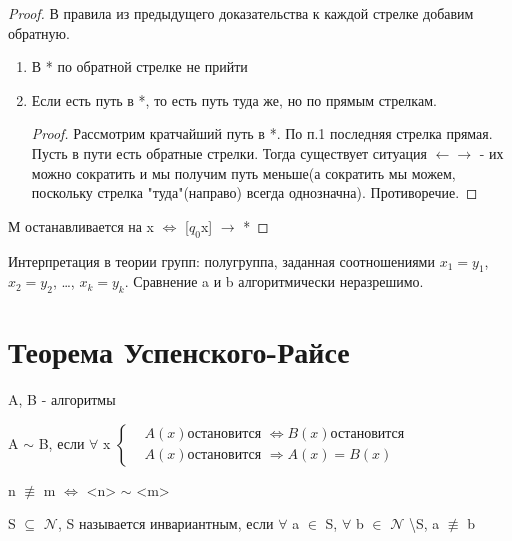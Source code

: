 \begin{proof}
	В правила из предыдущего доказательства к каждой стрелке добавим обратную.
	\begin{enumerate}
		\item В * по обратной стрелке не прийти
		\item Если есть путь в *, то есть путь туда же, но по прямым стрелкам.
		\begin{proof}
			Рассмотрим кратчайший путь в *. По п.1 последняя стрелка прямая. Пусть в пути есть обратные стрелки. Тогда существует ситуация
			$\leftarrow \rightarrow$ - их можно сократить и мы получим путь меньше(а сократить мы можем, поскольку стрелка "туда"(направо)
			всегда однозначна). Противоречие. 
		\end{proof}
	\end{enumerate}
	М останавливается на x $\Leftrightarrow$ [$q_0$x] $\longrightarrow$ *
\end{proof}

Интерпретация в теории групп: полугруппа, заданная соотношениями $x_1 = y_1$, $x_2 = y_2$, \dots, $x_k = y_k$. Сравнение a и b алгоритмически 
неразрешимо.

\section{Теорема Успенского-Райсе}
A, B - алгоритмы
\begin{Def}
	A $\sim$ B, если $\forall$ 
	x $\left\{
		\begin{aligned}
		&A(x) \text{остановится } \Leftrightarrow B(x) \text{остановится} \\
		&A(x) \text{остановится } \Rightarrow A(x) = B(x) 
		\end{aligned}
	\right.$

	n $\nequiv$ m $\Leftrightarrow$ <n> $\sim$ <m>
\end{Def}

\begin{Def}
	S $\subseteq$ $\mathcal{N}$, S называется инвариантным, если $\forall$ a $\in$ S, $\forall$ b $\in$ $\mathcal{N}$ \backslash S, 
	a $\nequiv$ b
\end{Def}

